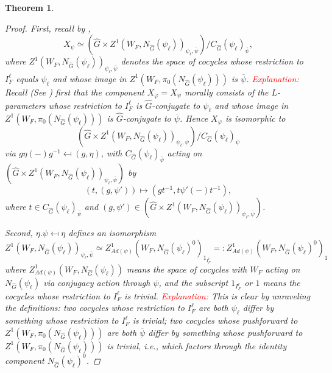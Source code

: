\documentclass{article}
\newcommand{\red}[1]{\textcolor{red}{#1}}
\newtheorem{theorem}{Theorem}
\begin{document}
\begin{theorem}
    \begin{proof}
    	First, recall by \cite[Subsection 4.6]{dat2022ihes},
    	$$X_{\psi} \simeq \left(\hat{G} \times Z^1(W_F, N_{\hat{G}}(\psi_{\ell}))_{\psi_{\ell}, \overline{\psi}}\right)/C_{\hat{G}}(\psi_{\ell})_{\overline{\psi}},$$
    	where $Z^1(W_F, N_{\hat{G}}(\psi_{\ell}))_{\psi_{\ell}, \overline{\psi}}$  denotes the space of cocycles whose restriction to $I_F^{\ell}$ equals $\psi_{\ell}$ and whose image in $Z^1(W_F, \pi_0(N_{\hat{G}}(\psi_{\ell})))$ is $\overline{\psi}$. 
    	\red{Explanation:} Recall (See \cite[Subsection 4.6]{dat2022ihes}) first that the component $X_{\varphi}=X_{\psi}$ morally consists of the $L$-parameters whose restriction to $I_F^{\ell}$ is $\hat{G}$-conjugate to $\psi_{\ell}$ and whose image in $Z^1(W_F, \pi_0(N_{\hat{G}}(\psi_{\ell})))$ is $\hat{G}$-conjugate to $\overline{\psi}$. Hence $X_{\varphi}$ is isomorphic to 
    	$$(\hat{G} \times Z^1(W_F, N_{\hat{G}}(\psi_{\ell}))_{\psi_{\ell}, \overline{\psi}})/C_{\hat{G}}(\psi_{\ell})_{\overline{\psi}}$$
    	via $g\eta(-)g^{-1} \mapsfrom (g, \eta)$, with $C_{\hat{G}}(\psi_{\ell})_{\overline{\psi}}$ acting on $(\hat{G} \times Z^1(W_F, N_{\hat{G}}(\psi_{\ell}))_{\psi_{\ell}, \overline{\psi}})$ by 
    	$$(t, (g, \psi')) \mapsto (gt^{-1}, t\psi'(-)t^{-1}),$$
    	where $t \in C_{\hat{G}}(\psi_{\ell})_{\overline{\psi}}$ and $(g, \psi') \in (\hat{G} \times Z^1(W_F, N_{\hat{G}}(\psi_{\ell}))_{\psi_{\ell}, \overline{\psi}})$.
    	
    	Second, $\eta.\psi \mapsfrom \eta$ defines an isomorphism
    	$$Z^1(W_F, N_{\hat{G}}(\psi_{\ell}))_{\psi_{\ell}, \overline{\psi}} \simeq Z^1_{Ad(\psi)}(W_F, N_{\hat{G}}(\psi_{\ell})^0)_{1_{I_F^{\ell}}}=:Z^1_{Ad(\psi)}(W_F, N_{\hat{G}}(\psi_{\ell})^0)_1$$
    	where $Z^1_{Ad(\psi)}(W_F, N_{\hat{G}}(\psi_{\ell}))$ means the space of cocycles with $W_F$ acting on $N_{\hat{G}}(\psi_{\ell})$ via conjugacy action through $\psi$, and the subscript $1_{I_F^{\ell}}$ or $1$ means the cocycles whose restriction to $I_F^{\ell}$ is trivial. 
    	\red{Explanation:} This is clear by unraveling the definitions: two cocycles whose restriction to $I_F^\ell$ are both $\psi_{\ell}$ differ by something whose restriction to $I_F^{\ell}$ is trivial; two cocycles whose pushforward to $Z^1(W_F, \pi_0(N_{\hat{G}}(\psi_{\ell})))$ are both $\overline{\psi}$ differ by something whose pushforward to $Z^1(W_F, \pi_0(N_{\hat{G}}(\psi_{\ell})))$ is trivial, i.e., which factors through the identity component $N_{\hat{G}}(\psi_{\ell})^0$.
    	

\end{proof}
\end{theorem}
\end{document}
